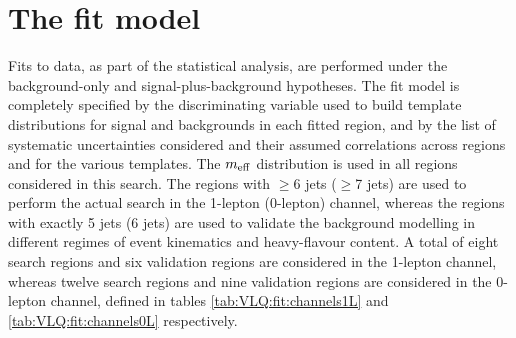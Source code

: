 \section{The fit model}
Fits to data, as part of the statistical analysis, are performed under the background-only and signal-plus-background hypotheses.
The fit model is completely specified by the discriminating variable used to build template distributions for signal and backgrounds  in each fitted region, and by the list of systematic uncertainties considered and their assumed correlations across regions and for the various templates. The $m_{\rm eff}$ distribution is used in all regions considered in this search. The regions with $\ge$6 jets ($\ge$7 jets) are used to perform the actual search in the 1-lepton (0-lepton) channel, whereas the regions with exactly 5 jets (6 jets) are used to validate the background modelling in different regimes of event kinematics and heavy-flavour content. A total of eight search regions and six validation regions are considered in the 1-lepton channel, whereas twelve search regions and nine validation regions are considered in the 0-lepton channel, defined in tables \ref{tab:VLQ:fit:channels1L} and \ref{tab:VLQ:fit:channels0L} respectively.
